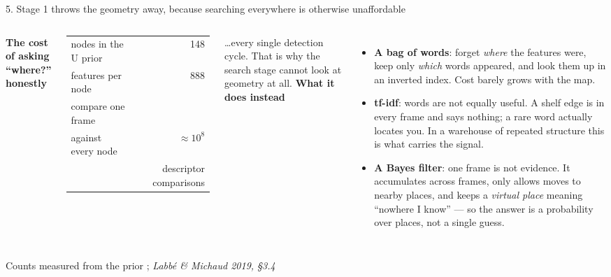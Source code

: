 \documentclass[11pt,aspectratio=169]{beamer}
\newcommand{\repo}[1]{\texttt{\detokenize{#1}}}
\newcommand{\src}[1]{\vfill{\tiny\color{black!55}#1}}
\newcommand{\paper}[1]{\textit{#1}}
\begin{document}
\begin{frame}{5. Stage 1 throws the geometry away, because searching everywhere is otherwise unaffordable}
  \begin{columns}[T]
      \small
      \textbf{The cost of asking ``where?'' honestly}
      \par\vspace{0.4em}
      \begin{tabular}{lr}
        \toprule
        nodes in the U prior & 148 \\
        features per node & 888 \\
        \midrule
        compare one frame\\ against every node & $\approx\!10^{8}$ \\
        & \scriptsize descriptor comparisons \\
        \bottomrule
      \end{tabular}
      \par\vspace{0.8em}
      \small …every single detection cycle. That is why the search stage
      cannot look at geometry at all.
      \small
      \textbf{What it does instead}
      \begin{itemize}
        \item \textbf{A bag of words}: forget \emph{where} the features were,
              keep only \emph{which} words appeared, and look them up in an
              inverted index. Cost barely grows with the map.
        \item \textbf{tf-idf}: words are not equally useful. A shelf edge is
              in every frame and says nothing; a rare word actually locates
              you. In a warehouse of repeated structure this is what carries
              the signal.
        \item \textbf{A Bayes filter}: one frame is not evidence. It
              accumulates across frames, only allows moves to nearby places,
              and keeps a \emph{virtual place} meaning ``nowhere I know'' ---
              so the answer is a probability over places, not a single guess.
      \end{itemize}
  \end{columns}
  \src{Counts measured from the prior \repo{.db}; \paper{Labbé \& Michaud 2019, §3.4}}
\end{frame}
\end{document}
